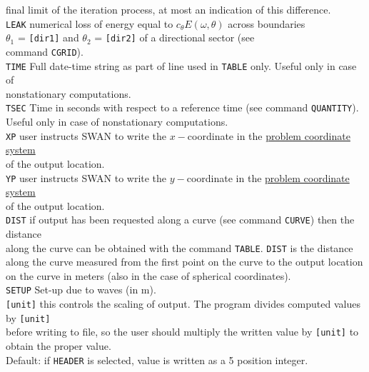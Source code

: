 \documentclass[12pt]{book}
\begin{document}
\begin{tabbing}
                final limit of the iteration process, at most an indication of this difference.\-\\
{\tt LEAK}   \> numerical loss of energy equal to $c_{\theta} E(\omega,\theta)$ across boundaries\+\\
                $\theta_1$ = {\tt [dir1]} and $\theta_2$ = {\tt [dir2]} of a directional sector (see\\
                command {\tt CGRID}).\-\\
{\tt TIME}   \> Full date-time string as part of line used in {\tt TABLE} only. Useful only in case of\+\\
                nonstationary computations.\-\\
{\tt TSEC}   \> Time in seconds with respect to a reference time (see command {\tt QUANTITY}).\+\\
                Useful only in case of nonstationary computations.\-\\
{\tt XP}     \> user instructs SWAN to write the $x-$coordinate in the \underline{problem coordinate system}\+\\
                of the output location.\-\\
{\tt YP}     \> user instructs SWAN to write the $y-$coordinate in the \underline{problem coordinate system}\+\\
                of the output location.\-\\
{\tt DIST}   \> if output has been requested along a curve (see command {\tt CURVE}) then the distance\+\\
                along the curve can be obtained with the command {\tt TABLE}. {\tt DIST} is the distance\\
                along the curve measured from the first point on the curve to the output location\\
                on the curve in meters (also in the case of spherical coordinates).\-\\
{\tt SETUP}  \> Set-up due to waves (in m).\\
{\tt [unit]} \> this controls the scaling of output. The program divides computed values by {\tt [unit]}\+\\
                before writing to file, so the user should multiply the written value by {\tt [unit]} to\\
                obtain the proper value.\\
                Default: if {\tt HEADER} is selected, value is written as a 5 position integer.\\

\end{tabbing}
\end{document}
